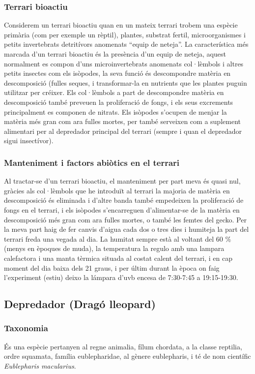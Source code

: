 \subsubsection{Terrari bioactiu}
Considerem un terrari bioactiu quan en un mateix terrari trobem una espècie primària (com per exemple un rèptil), plantes, substrat fertil, microorganismes i petits invertebrats detritívors anomenats ``equip de neteja''. La característica més marcada d’un terrari bioactiu és la presència d’un equip de neteja, aquest normalment es compon d’uns microinvertebrats anomenats col·lèmbols i altres petits insectes com els isòpodes, la seva funció és descompondre matèria en descomposició (fulles seques, i transformar-la en nutrients que les plantes puguin utilitzar per créixer. Els col·lèmbols a part de descompondre matèria en descomposició també preveuen la proliferació de fongs, i els seus excrements principalment es componen de nitrats. Els isòpodes s’ocupen de menjar la matèria més gran com ara fulles mortes, per també serveixen com a suplement alimentari per al depredador principal del terrari (sempre i quan el depredador sigui insectívor).

\subsubsection{Manteniment i factors abiòtics en el terrari}
Al tractar-se d’un terrari bioactiu, el manteniment per part meva és quasi nul, gràcies als col·lèmbols que he introduït al terrari la majoria de matèria en descomposició és eliminada i d’altre banda també empedeixen la proliferació de fongs en el terrari, i els isòpodes s’encarreguen d’alimentar-se de la matèria en descomposició més gran com ara fulles mortes, o també les femtes del gecko. Per la meva part haig de fer canvis d’aigua cada dos o tres dies i humiteja la part del terrari freda una vegada al dia. La humitat sempre està al voltant del 60 \% (menys en èpoques de muda), la temperatura la regulo amb una lampara calefactora i una manta tèrmica situada al costat calent del terrari, i en cap moment del dia baixa dels 21 graus, i per últim durant la època on faig l'experiment (estiu) deixo la lámpara d’uvb encesa de 7:30-7:45 a 19:15-19:30.

\subsection{Depredador (Dragó lleopard)}

\subsubsection{Taxonomia}
És una espècie pertanyen al regne animalia, fílum chordata, a la classe reptilia, ordre squamata, família eublepharidae, al gènere eublepharis, i té de nom científic \textit{Eublepharis macularius}.

